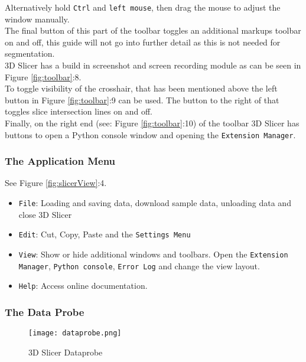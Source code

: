 Alternatively hold \texttt{Ctrl} and \texttt{left mouse}, then drag the mouse to adjust the window manually.\\
The final button of this part of the toolbar toggles an additional markups toolbar on and off, this guide will not go into further detail as this is not needed for segmentation.\\
3D Slicer has a build in screenshot and screen recording module as can be seen in Figure \ref{fig:toolbar}:8.\\
To toggle visibility of the crosshair, that has been mentioned above the left button in Figure \ref{fig:toolbar}:9 can be used. The button to the right of that toggles slice intersection lines on and off.\\
Finally, on the right end (see: Figure \ref{fig:toolbar}:10) of the toolbar 3D Slicer has buttons to open a Python console window and opening the \texttt{Extension Manager}.

\subsubsection{The Application Menu}
See Figure \ref{fig:slicerView}:4. %
\begin{itemize}
	\item \texttt{File}: Loading and saving data, download sample data, unloading data and close 3D Slicer
	\item \texttt{Edit}: Cut, Copy, Paste and the \texttt{Settings Menu}
	\item \texttt{View}: Show or hide additional windows and toolbars. Open the \texttt{Extension Manager}, \texttt{Python console}, \texttt{Error Log} and change the view layout.
	\item \texttt{Help}: Access online documentation.
\end{itemize}

\subsubsection{The Data Probe}
\begin{figure}[h!] %
	\centerline{ %
		\texttt{[image: dataprobe.png]}}
	\caption{3D Slicer Dataprobe}
	\label{fig:dataprobe}
\end{figure}

